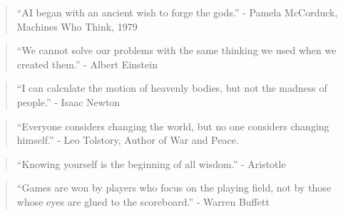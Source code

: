 \begin{quote}
``AI began with an ancient wish to forge the gods.'' - Pamela McCorduck, Machines Who Think, 1979
\end{quote}

\begin{quote}
``We cannot solve our problems with the same thinking we used when we created them.'' - Albert Einstein
\end{quote}

\begin{quote}
	``I can calculate the motion of heavenly bodies, but not the madness of people.'' - Isaac Newton
\end{quote}

\begin{quote}
	``Everyone considers changing the world, but no one considers changing himself.'' - Leo Tolstory, Author of War and Peace.
\end{quote}

\begin{quote}
	``Knowing yourself is the beginning of all wisdom.'' - Aristotle
\end{quote}

\begin{quote}
	``Games are won by players who focus on the playing field, not by those whose eyes are glued to the scoreboard.'' - Warren Buffett
\end{quote} 

